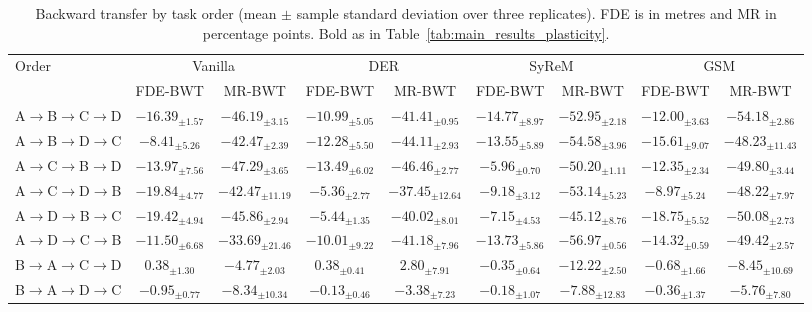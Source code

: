 \begin{table}[!t]
\centering
\caption{Backward transfer by task order (mean $\pm$ sample standard deviation over three replicates). FDE is in metres and MR in percentage points. Bold as in Table~\ref{tab:main_results_plasticity}.}
\label{tab:main_results_stability}
\setlength{\tabcolsep}{3.5pt}
\renewcommand{\arraystretch}{1.0}
\fontsize{7}{7.7}\selectfont
\begin{tabular*}{\textwidth}{@{\extracolsep{\fill}}lcccccccc}
\toprule
Order & \multicolumn{2}{c}{Vanilla} & \multicolumn{2}{c}{DER} & \multicolumn{2}{c}{SyReM} & \multicolumn{2}{c}{GSM} \\
\cmidrule(lr){2-3}\cmidrule(lr){4-5}\cmidrule(lr){6-7}\cmidrule(lr){8-9}
 & FDE-BWT & MR-BWT & FDE-BWT & MR-BWT & FDE-BWT & MR-BWT & FDE-BWT & MR-BWT \\
\midrule
A$\to$B$\to$C$\to$D & $-16.39_{\pm1.57}$ & $-46.19_{\pm3.15}$ & $-10.99_{\pm5.05}$ & $-41.41_{\pm0.95}$ & $-14.77_{\pm8.97}$ & $-52.95_{\pm2.18}$ & $-12.00_{\pm3.63}$ & $-54.18_{\pm2.86}$ \\
A$\to$B$\to$D$\to$C & $-8.41_{\pm5.26}$ & $-42.47_{\pm2.39}$ & $-12.28_{\pm5.50}$ & $-44.11_{\pm2.93}$ & $-13.55_{\pm5.89}$ & $-54.58_{\pm3.96}$ & $-15.61_{\pm9.07}$ & $-48.23_{\pm11.43}$ \\
A$\to$C$\to$B$\to$D & $-13.97_{\pm7.56}$ & $-47.29_{\pm3.65}$ & $-13.49_{\pm6.02}$ & $-46.46_{\pm2.77}$ & $-5.96_{\pm0.70}$ & $-50.20_{\pm1.11}$ & $-12.35_{\pm2.34}$ & $-49.80_{\pm3.44}$ \\
A$\to$C$\to$D$\to$B & {\boldmath$-19.84_{\pm4.77}$} & $-42.47_{\pm11.19}$ & $-5.36_{\pm2.77}$ & $-37.45_{\pm12.64}$ & $-9.18_{\pm3.12}$ & $-53.14_{\pm5.23}$ & $-8.97_{\pm5.24}$ & $-48.22_{\pm7.97}$ \\
A$\to$D$\to$B$\to$C & $-19.42_{\pm4.94}$ & $-45.86_{\pm2.94}$ & $-5.44_{\pm1.35}$ & $-40.02_{\pm8.01}$ & $-7.15_{\pm4.53}$ & $-45.12_{\pm8.76}$ & $-18.75_{\pm5.52}$ & {\boldmath$-50.08_{\pm2.73}$} \\
A$\to$D$\to$C$\to$B & $-11.50_{\pm6.68}$ & $-33.69_{\pm21.46}$ & $-10.01_{\pm9.22}$ & $-41.18_{\pm7.96}$ & $-13.73_{\pm5.86}$ & {\boldmath$-56.97_{\pm0.56}$} & $-14.32_{\pm0.59}$ & $-49.42_{\pm2.57}$ \\
B$\to$A$\to$C$\to$D & $0.38_{\pm1.30}$ & $-4.77_{\pm2.03}$ & $0.38_{\pm0.41}$ & $2.80_{\pm7.91}$ & $-0.35_{\pm0.64}$ & $-12.22_{\pm2.50}$ & $-0.68_{\pm1.66}$ & $-8.45_{\pm10.69}$ \\
B$\to$A$\to$D$\to$C & $-0.95_{\pm0.77}$ & $-8.34_{\pm10.34}$ & $-0.13_{\pm0.46}$ & $-3.38_{\pm7.23}$ & $-0.18_{\pm1.07}$ & $-7.88_{\pm12.83}$ & $-0.36_{\pm1.37}$ & $-5.76_{\pm7.80}$ \\

\end{tabular*}
\end{table}
